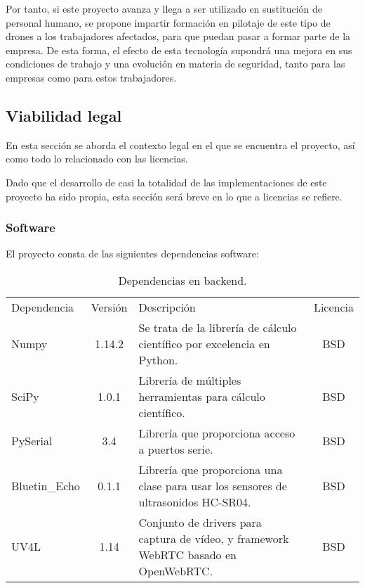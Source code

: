 Por tanto, si este proyecto avanza y llega a ser utilizado en sustitución de personal humano, se propone impartir formación en pilotaje de este tipo de drones a los trabajadores afectados, para que puedan pasar a formar parte de la empresa. De esta forma, el efecto de esta tecnología supondrá una mejora en sus condiciones de trabajo y una evolución en materia de seguridad, tanto para las empresas como para estos trabajadores.


\subsection{Viabilidad legal}

En esta sección se aborda el contexto legal en el que se encuentra el proyecto, así como todo lo relacionado con las licencias. 

Dado que el desarrollo de casi la totalidad de las implementaciones de este proyecto ha sido propia, esta sección será breve en lo que a licencias se refiere. 

\subsubsection{Software}
El proyecto consta de las siguientes dependencias software:

\begin{table}[H]
\begin{center}
		\begin{tabular}{l | c | m{6cm} | c}\hline
			\toprule
			Dependencia & Versión & Descripción & Licencia\\
			\otoprule
			Numpy & 1.14.2 & Se trata de la librería de cálculo científico por excelencia en Python.  & BSD  \\
			SciPy & 1.0.1 & Librería de múltiples herramientas para cálculo científico.  & BSD\\
			PySerial & 3.4 & Librería que proporciona acceso a puertos serie. & BSD\\
			Bluetin\_Echo & 0.1.1 & Librería que proporciona una clase para usar los sensores de ultrasonidos HC-SR04. & BSD\\
			UV4L & 1.14 & Conjunto de drivers para captura de vídeo, y framework WebRTC basado en OpenWebRTC. & BSD\\
			
			\hline
			\bottomrule
		\end{tabular}
		\caption{Dependencias en backend.}
		\label{tb:licensebackend}
		\end{center}
\end{table}

